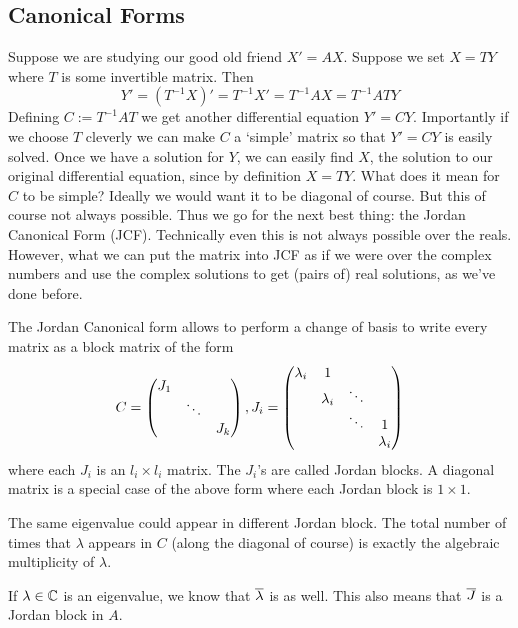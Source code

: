 \subsection{Canonical Forms}
Suppose we are studying our good old friend $X' = AX$. Suppose we set $X = TY$ where $T$ is some invertible matrix. Then
$$ Y' = (T^{-1} X)' = T^{-1} X' = T^{-1} AX = T^{-1}AT Y $$
Defining $C := T^{-1}AT$ we get another differential equation $Y' = CY$. Importantly if we choose $T$ cleverly we can make $C$ a `simple' matrix so that $Y' = CY$ is easily solved. Once we have a solution for $Y$, we can easily find $X$, the solution to our original differential equation, since by definition $X = TY$. What does it mean for $C$ to be simple? Ideally we would want it to be diagonal of course. But this of course not always possible. Thus we go for the next best thing: the Jordan Canonical Form (JCF). Technically even this is not always possible over the reals. However, what we can put the matrix into JCF as if we were over the complex numbers and use the complex solutions to get (pairs of) real solutions, as we've done before.

The Jordan Canonical form allows to perform a change of basis to write every matrix as a block matrix of the form
\begin{align*}
    C = \begin{pmatrix} J_1 & & \\ & \ddots &\\ & & J_k \end{pmatrix}, J_i = 
\begin{pmatrix}
\lambda_i & 1 \\
 & \lambda_i & \ddots\\
 & & \ddots & 1\\
& & &\lambda_i
\end{pmatrix}
\end{align*}
where each $J_i$ is an $l_i \times l_i$ matrix. The $J_i$'s are called Jordan blocks. A diagonal matrix is a special case of the above form where each Jordan block is $1 \times 1$.
\begin{remark}
The same eigenvalue could appear in different Jordan block. The total number of times that $\lambda$ appears in $C$ (along the diagonal of course) is exactly the algebraic multiplicity of $\lambda$.
\end{remark}
\begin{remark}
If $\lambda \in \mathbb{C}$ is an eigenvalue, we know that $\overline{\lambda}$ is as well. This also means that $\overline{J}$ is a Jordan block in $A$.
\end{remark}
